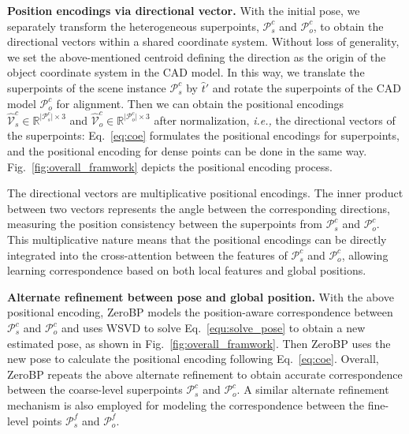 \vspace{1mm}
\noindent\textbf{Position encodings via directional vector.}
With the initial pose, we separately transform the heterogeneous superpoints, $\mathcal{P}^{c}_s$ and $\mathcal{P}^{c}_o$, to obtain the directional vectors within a shared coordinate system. Without loss of generality, we set the above-mentioned centroid defining the direction as the origin of the object coordinate system in the CAD model.
In this way, we translate the superpoints of the scene instance $\mathcal{P}_s^c$ by $\hat{t}'$ and rotate the superpoints of the CAD model $\mathcal{P}_o^c$ for alignment. Then we can obtain the positional encodings $\hat{\mathcal{V}}_s^c \in \mathbb{R}^{\lvert {\mathcal{P}^c_s}\rvert \times 3}$ and $\hat{\mathcal{V}}_o^c \in \mathbb{R}^{\lvert {\mathcal{P}^c_o}\rvert \times 3}$ after normalization, \emph{i.e.,} the directional vectors of the superpoints:
Eq.~\eqref{eq:coe} formulates the positional encodings for superpoints, and the positional encoding for dense points can be done in the same way. Fig.~\ref{fig:overall_framwork} depicts the positional encoding process.

The directional vectors are multiplicative positional encodings. The inner product between two vectors represents the angle between the corresponding directions, measuring the position consistency between the superpoints from $\mathcal{P}_{s}^{c}$ and $\mathcal{P}_{o}^{c}$. This multiplicative nature means that the positional encodings can be directly integrated into the cross-attention between the features of $\mathcal{P}^{c}_s$ and $\mathcal{P}^{c}_o$, allowing learning correspondence based on both local features and global positions.

\vspace{1mm}
\noindent\textbf{Alternate refinement between pose and global position.} With the above positional encoding, ZeroBP models the position-aware correspondence between $\mathcal{P}_{s}^{c}$ and $\mathcal{P}_{o}^{c}$ and uses WSVD to solve Eq.~\eqref{equ:solve_pose} to obtain a new estimated pose, as shown in Fig.~\ref{fig:overall_framwork}. Then ZeroBP uses the new pose to calculate the positional encoding following Eq.~\eqref{eq:coe}. Overall, ZeroBP repeats the above alternate refinement to obtain accurate correspondence between the coarse-level superpoints $\mathcal{P}_{s}^{c}$ and $\mathcal{P}_{o}^{c}$. A similar alternate refinement mechanism is also employed for modeling the correspondence between the fine-level points $\mathcal{P}_{s}^{f}$ and $\mathcal{P}_{o}^{f}$.

